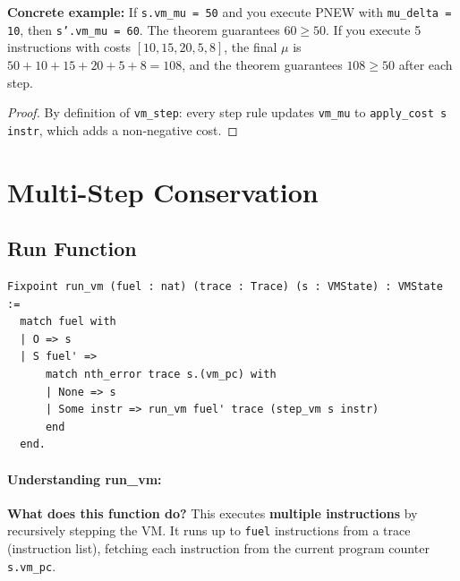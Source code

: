 \textbf{Concrete example:} If \texttt{s.vm\_mu = 50} and you execute PNEW with \texttt{mu\_delta = 10}, then \texttt{s'.vm\_mu = 60}. The theorem guarantees $60 \geq 50$. If you execute 5 instructions with costs $[10, 15, 20, 5, 8]$, the final $\mu$ is $50 + 10 + 15 + 20 + 5 + 8 = 108$, and the theorem guarantees $108 \geq 50$ after each step.


\begin{proof}
By definition of \texttt{vm\_step}: every step rule updates \texttt{vm\_mu} to \texttt{apply\_cost s instr}, which adds a non-negative cost.
\end{proof}

\section{Multi-Step Conservation}

\subsection{Run Function}

\begin{lstlisting}
Fixpoint run_vm (fuel : nat) (trace : Trace) (s : VMState) : VMState :=
  match fuel with
  | O => s
  | S fuel' =>
      match nth_error trace s.(vm_pc) with
      | None => s
      | Some instr => run_vm fuel' trace (step_vm s instr)
      end
  end.
\end{lstlisting}

\paragraph{Understanding run\_vm:}

\textbf{What does this function do?} This executes \textbf{multiple instructions} by recursively stepping the VM. It runs up to \texttt{fuel} instructions from a trace (instruction list), fetching each instruction from the current program counter \texttt{s.vm\_pc}.

